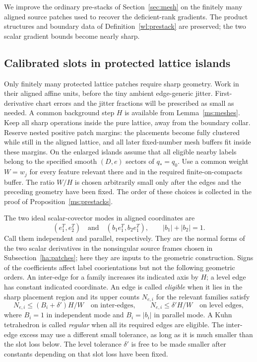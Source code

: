 We improve the ordinary pre-stacks of Section~\ref{sec:mesh} on the
finitely many aligned source patches used to recover the deficient-rank
gradients.  The product structures and boundary data of
Definition~\ref{wl:prestack} are preserved; the two scalar gradient
bounds become nearly sharp.

\subsection{Calibrated slots in protected lattice islands}

Only finitely many protected lattice patches require sharp geometry.
Work in their aligned affine units, before the tiny ambient
edge-generic jitter.  First-derivative chart errors and the jitter
fractions will be prescribed as small as needed.  A common background
step $H$ is available from Lemma~\ref{ms:meshes}.  Keep all sharp operations
inside the pure lattice, away from the boundary collar.  Reserve nested
positive patch margins: the placements become fully clustered while
still in the aligned lattice, and all later fixed-number mesh buffers
fit inside these margins.  On the enlarged islands assume that all
eligible nearby labels belong to the specified smooth $(D,e)$ sectors
of $q_*=q_0$.  Use a common weight $W=w_j$ for every feature relevant
there and in the required finite-on-compacts buffer.  The ratio $W/H$
is chosen arbitrarily small only after the edges and the preceding
geometry have been fixed.  The order of these choices is collected in
the proof of Proposition~\ref{ms:prestacks}.

The two ideal scalar-covector modes in aligned coordinates are
\begin{equation}
 (e_1^T,e_2^T)
 \quad\text{and}\quad
 (b_1e_1^T,b_2e_1^T),\qquad |b_1|+|b_2|=1.
 \label{ms:modes}
\end{equation}
Call them independent and parallel, respectively.  They are the
normal forms of the two scalar derivatives in the nonsingular source
frames chosen in Subsection~\ref{ha:patches}; here they are inputs to
the geometric construction.  Signs of the coefficients affect label
coorientations but not the following geometric orders.  An inter-edge
for a family increases its indicated
axis by $H$; a level edge has constant indicated coordinate.  An edge
is called \emph{eligible} when it lies in the sharp placement region
and its upper counts $N_{e,i}$ for the relevant families satisfy
\begin{equation}
 N_{e,i}\le (B_i+\delta')H/W\quad\text{on inter-edges},
 \qquad
 N_{e,i}\le\delta'H/W\quad\text{on level edges},
 \label{ms:regular-counts}
\end{equation}
where $B_i=1$ in independent mode and $B_i=|b_i|$ in parallel mode.
A Kuhn tetrahedron is called \emph{regular} when all its required
edges are eligible.
The inter-edge excess may use a different small tolerance, as long as
it is much smaller than the slot loss below.  The level tolerance
$\delta'$ is free to be made smaller after constants depending on
that slot loss have been fixed.

